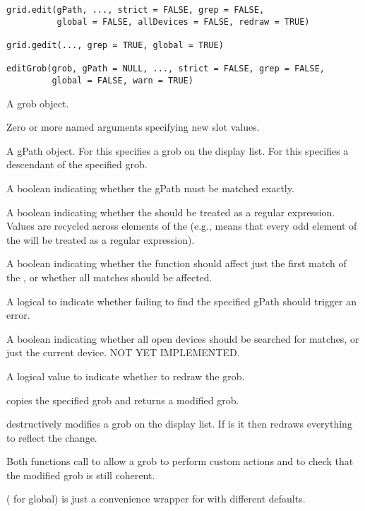 %
\begin{Usage}
\begin{verbatim}
grid.edit(gPath, ..., strict = FALSE, grep = FALSE,
          global = FALSE, allDevices = FALSE, redraw = TRUE)

grid.gedit(..., grep = TRUE, global = TRUE)

editGrob(grob, gPath = NULL, ..., strict = FALSE, grep = FALSE,
         global = FALSE, warn = TRUE) 
\end{verbatim}
\end{Usage}
%
\begin{Arguments}
\begin{ldescription}
\item[\code{grob}] A grob object.
\item[\code{...}] Zero or more named arguments specifying new slot values.
\item[\code{gPath}]  A gPath object. For  this
specifies a grob on the display list.  For  this
specifies a descendant of the specified grob. 
\item[\code{strict}]  A boolean indicating whether the gPath must be
matched exactly. 
\item[\code{grep}] A boolean indicating whether the  should
be treated as a regular expression.  Values are recycled across
elements of the  (e.g.,  means
that every odd element of the  will be treated as
a regular expression).

\item[\code{global}]  A boolean indicating whether the function should affect
just the first match of the , or whether all matches
should be affected.

\item[\code{warn}] A logical to indicate whether failing to find the
specified gPath should trigger an error.  
\item[\code{allDevices}]  A boolean indicating whether all open devices
should
be searched for matches, or just the current device.
NOT YET IMPLEMENTED.

\item[\code{redraw}] A logical value to indicate whether to redraw the grob. 
\end{ldescription}
\end{Arguments}
%
\begin{Details}\relax
{} copies the specified grob and returns a modified
grob.

 destructively modifies a grob on the display list.
If 
is  it then redraws everything to reflect the change.

Both functions call  to allow a grob to perform
custom actions and  to check that the modified grob
is still coherent.

 ( for global) is just a convenience wrapper for
 with different defaults.
\end{Details}
